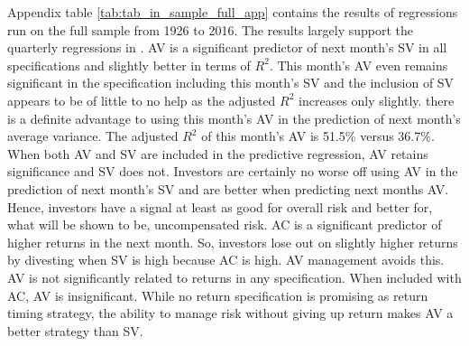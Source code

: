 Appendix table \ref{tab:tab_in_sample_full_app} contains the results of regressions run on the full sample from 1926 to 2016. The results largely support the quarterly regressions in \citet{pollet_average_2010}. AV is a significant predictor of next month’s SV in all specifications and slightly better in terms of $R^{2}$. This month’s AV even remains significant in the specification including this month’s SV and the inclusion of SV appears to be of little to no help as the adjusted $R^{2}$ increases only slightly. there is a definite advantage to using this month’s AV in the prediction of next month’s average variance. The adjusted $R^{2}$ of this month's AV is 51.5\% versus 36.7\%. When both AV and SV are included in the predictive regression, AV retains significance and SV does not. Investors are certainly no worse off using AV in the prediction of next month's SV and are better when predicting next months AV. Hence, investors have a signal at least as good for overall risk and better for, what will be shown to be, uncompensated risk. AC is a significant predictor of higher returns in the next month. So, investors lose out on slightly higher returns by divesting when SV is high because AC is high. AV management avoids this. AV is not significantly related to returns in any specification. When included with AC, AV is insignificant. While no return specification is promising as return timing strategy, the ability to manage risk without giving up return makes AV a better strategy than SV.
